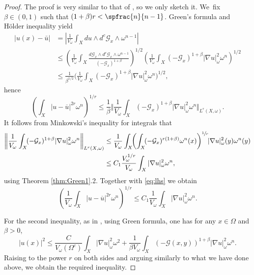 \begin{proof}
The proof is very similar to that of \cite[Th.\,2.1 \& Lem.\,6.2]{GPSS23},
so we only sketch it. We~fix $ \beta\in (0,1)$ such that $(1+\beta)r< \spfrac{n}{n-1}$.
Green's formula and Hölder inequality yield
\begin{align*}
|u(x)-\bar u| &= \left| \frac{1}{V_\omega}\int_X du\wedge d^c {\mathcal{G}_x}\wedge \omega^{n-1} \right|\\
&\leq \left( \frac{1}{V_\omega} \int_X \frac{d \mathcal{G}_x \wedge d^c \mathcal{G}_x\wedge \omega^{n-1}}{(-\mathcal{G}_x)^{1+\beta}} \right)^{1/2} \left( \frac{1}{V_\omega}\int_X ( - \mathcal{G}_x)^{1+\beta} |\nabla u|^2_\omega \omega^n \right)^{1/2}\\
&\leq \frac{1}{\beta^{1/2}} \biggl( \frac{1}{V_\omega}\int_X ( - \mathcal{G}_x)^{1+\beta} |\nabla u|^2_\omega \omega^n \biggr)^{1/2},
\end{align*}
hence
\begin{equation}\label{eq:lhs}
\left( \int_X |u-\overline{u}|^{2r}\omega^n\right)^{1/r}
\leq\frac{1}{\beta} \biggl\Vert \frac{1}{V_\omega}\int_X ( - \mathcal{G}_x)^{1+\beta} |\nabla u|^2_\omega \omega^n \biggr\Vert_{L^r(X, \omega)}.
\end{equation}
It follows from Minkowski's inequality for integrals that
\begin{align*}
\biggl\Vert \frac{1}{V_\omega}\int_X \!( - \mathcal{G}_x)^{1+\beta} |\nabla u|^2_\omega \omega^n \biggr\Vert_{L^r(X, \omega)}
&\leq  \frac{1}{V_\omega} \int_X\!\! \left( \int_X \!( - \mathcal{G}_x)^{r(1+\beta)}\omega^n(x) \right)^{\sfrac{1}{r}}\hspace*{-1mm} |\nabla u|^2_\omega(y) \omega^n(y) \\
&\leq  C_1 \frac{V_{\omega}^{1/r}}{V_{\omega}} \int_X |\nabla u|^2_\omega \omega^n,
\end{align*}
using Theorem \ref{thm:Green1}.2.
Together with \eqref{eq:lhs} we obtain
\[
\left(\frac{1}{V_{\omega}} \int_X |u-\overline{u}|^{2r}\omega^n\right)^{1/r}
\leq C_1\frac{1}{V_{\omega}} \int_X |\nabla u|^2_\omega \omega^n.
\]

For the second inequality, as in \cite[Lem.\,6.2]{GPSS23}, using Green formula, one has for any $x\in \Omega$ and $\beta>0$,
\[
|u(x)|^2\leq \frac{C}{V_\omega(\Omega^c)}\int_X |\nabla u|^2_\omega \omega^2 + \frac{1}{ \beta V_\omega} \int_X (-\mathcal{G}(x,y))^{1+\beta}|\nabla u|^2_\omega \omega^n.
\]
Raising to the power $r$ on both sides and arguing similarly to what we have done above, we obtain the required inequality.
\end{proof}

